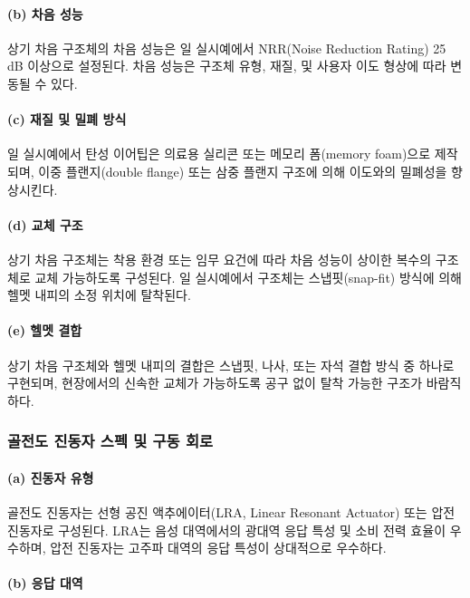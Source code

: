 \documentclass{article}
\begin{document}
\paragraph{(b) 차음 성능}

상기 차음 구조체의 차음 성능은 일 실시예에서 NRR(Noise Reduction Rating) 25\,dB 이상으로 설정된다. 차음 성능은 구조체 유형, 재질, 및 사용자 이도 형상에 따라 변동될 수 있다.

\paragraph{(c) 재질 및 밀폐 방식}

일 실시예에서 탄성 이어팁은 의료용 실리콘 또는 메모리 폼(memory foam)으로 제작되며, 이중 플랜지(double flange) 또는 삼중 플랜지 구조에 의해 이도와의 밀폐성을 향상시킨다.

\paragraph{(d) 교체 구조}

상기 차음 구조체는 착용 환경 또는 임무 요건에 따라 차음 성능이 상이한 복수의 구조체로 교체 가능하도록 구성된다. 일 실시예에서 구조체는 스냅핏(snap-fit) 방식에 의해 헬멧 내피의 소정 위치에 탈착된다.

\paragraph{(e) 헬멧 결합}

상기 차음 구조체와 헬멧 내피의 결합은 스냅핏, 나사, 또는 자석 결합 방식 중 하나로 구현되며, 현장에서의 신속한 교체가 가능하도록 공구 없이 탈착 가능한 구조가 바람직하다.

\subsubsection{골전도 진동자 스펙 및 구동 회로}

\paragraph{(a) 진동자 유형}

골전도 진동자는 선형 공진 액추에이터(LRA, Linear Resonant Actuator) 또는 압전 진동자로 구성된다. LRA는 음성 대역에서의 광대역 응답 특성 및 소비 전력 효율이 우수하며, 압전 진동자는 고주파 대역의 응답 특성이 상대적으로 우수하다.

\paragraph{(b) 응답 대역}
\end{document}

